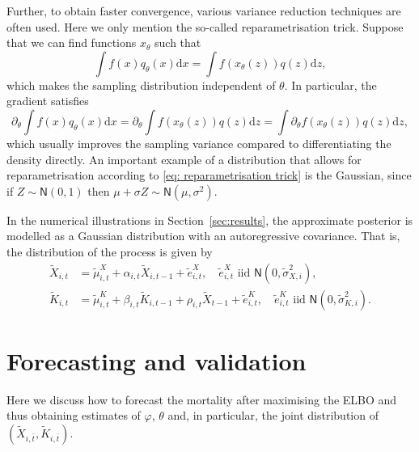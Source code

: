 \documentclass[preprint,12pt]{elsarticle}
\def\pp{\partial}
\def\dd{\ensuremath{\mathrm{d}}}
\begin{document}
Further, to obtain faster convergence, various variance reduction techniques are often used. Here we only mention the so-called reparametrisation trick. Suppose that we can find functions $x_\theta$ such that
\begin{equation}\label{eq: reparametrisation trick}
	\int f(x) q_\theta(x)\dd x = \int f(x_\theta(z))q(z)\dd z,
\end{equation}
which makes the sampling distribution independent of $\theta$. In particular, the gradient satisfies
\begin{equation}
	\partial_\theta \int f(x) q_\theta(x)\dd x = \partial_\theta \int f(x_\theta(z))q(z)\dd z = \int \pp_\theta f(x_\theta(z))q(z)\dd z,
\end{equation}
which usually improves the sampling variance compared to differentiating the density directly. An important example of a distribution that allows for reparametrisation according to \eqref{eq: reparametrisation trick} is the Gaussian, since if $Z\sim \mathsf N(0,1)$ then $\mu + \sigma Z\sim \mathsf N (\mu,\sigma^2)$.

In the numerical illustrations in Section~\ref{sec:results}, the approximate posterior is modelled as a Gaussian distribution with an autoregressive covariance. That is, the distribution of the process is given by
\begin{align}
	\tilde X_{i,t} &= \tilde\mu^X_{i,t } + \alpha_{i,t}\tilde X_{i,t-1}  + \tilde e^X_{i,t},\quad \tilde e^X_{i,t} \text{ iid } \mathsf N(0,\tilde\sigma^2_{X,i}),\\
	\tilde K_{i,t} &= \tilde \mu^K_{i,t} + \beta_{i,t}\tilde K_{i,t-1} + \rho_{i,t}\tilde X_{t-1} + \tilde e^K_{i,t},\quad \tilde e^K_{i,t} \text{ iid } \mathsf N(0,\tilde \sigma^2_{K,i}).
\end{align}




\section{Forecasting and validation}\label{sec:forecastValidation}
Here we discuss how to forecast the mortality after maximising the ELBO and thus obtaining estimates of $\varphi$, $\theta$ and, in particular, the joint distribution of $(\tilde X_{i,\bar t},\tilde K_{i,\bar t})$.
\end{document}
